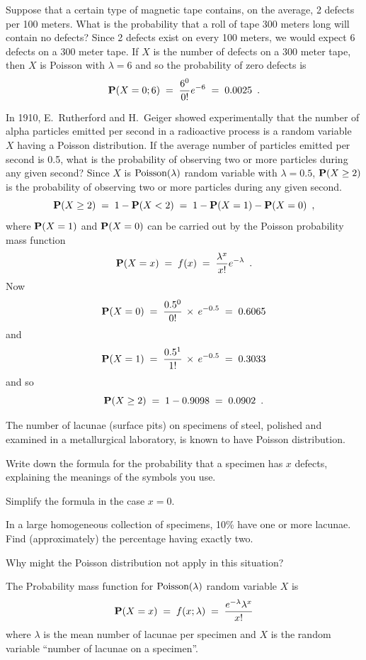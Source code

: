 \begin{ExerciseList}
\Exercise 
Suppose that a certain type of magnetic tape contains, on the average, 2 defects per 100 meters.  
What is the probability that a roll of tape 300 meters long will contain  no defects?
\Answer
Since 2 defects exist on every 100 meters, we would expect 6 defects on a 300 meter tape.  
If $X$ is the number of defects on a 300 meter tape, then $X$ is Poisson with $\lambda = 6$ and so the probability of zero defects is
$$\mathbf{P}(X=0;6)\;=\;\frac{6^0}{0!}e^{-6}\;=\;0.0025\enspace.$$

\Exercise
In 1910, E.~Rutherford and H.~Geiger showed experimentally that the number of alpha particles emitted per second in a radioactive process is a random variable $X$ having a Poisson distribution. If the average number of particles emitted per second is  0.5, what is the probability of observing two or more particles during any given second?
\Answer
Since $X$ is $\mbox{{\rm Poisson}}(\lambda)$ random variable with $\lambda=0.5$, $\mathbf{P}(X\geq2)$ 
is the probability of observing two or more particles during any
given second. $$\mathbf{P}(X\geq 2)\;=\;1-\mathbf{P}(X<2)\;=\;1-\mathbf{P}(X=1)-\mathbf{P}(X=0)\enspace,$$
where $\mathbf{P}(X=1)$ and $\mathbf{P}(X=0)$ can be carried out by the Poisson
probability mass function $$\mathbf{P}(X=x)\;=\; f(x)\;=\;\frac{\lambda^x}{x!}e^{-\lambda}\enspace.$$
Now \[\mathbf{P}(X=0)\;=\;\frac{0.5^0}{0!}\,\times \,e^{-0.5} \;=\; 0.6065\] and
\[ \mathbf{P}(X=1)\;=\;\frac{0.5^1}{1!}\,\times \, e^{-0.5}\;=\; 0.3033\] and so
$$\mathbf{P}(X\geq 2)\;=\; 1- 0.9098\;= \;0.0902\enspace.$$

\Exercise 
The number of lacunae (surface pits) on specimens of steel, polished and examined in a metallurgical laboratory, is known to have Poisson distribution.
\be
\item Write down the formula for the probability that a specimen has $x$
  defects, explaining the meanings of the symbols you use.
\item Simplify the formula in the case $x=0$.
\item In a large homogeneous collection of specimens, 10\% have one or more lacunae. Find (approximately) the percentage having exactly two.
\item Why might the Poisson distribution not apply in this situation?
\ee
\Answer
\be
\item The Probability mass function for $\mbox{{\rm Poisson}}(\lambda)$ random variable $X$ is 
\[\mathbf{P}(X=x)\;=\;f(x;\lambda)\;=\; \frac{e^{-\lambda}\lambda^x}{x!}\]
where $\lambda$ is the mean number of lacunae per specimen and $X$ is
the random variable ``number of lacunae on a specimen''.


\end{ExerciseList}
